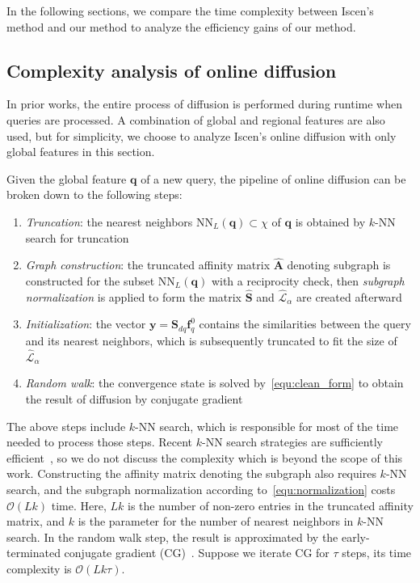 \documentclass[letterpaper]{article} \usepackage{aaai19}  \usepackage{times}  \usepackage{helvet}  \usepackage{courier}  \usepackage{url}  \usepackage{graphicx}  \frenchspacing  \setlength{\pdfpagewidth}{8.5in}  \setlength{\pdfpageheight}{11in}
\begin{document}
In the following sections, we compare the time complexity between Iscen's method and our method to analyze the efficiency gains of our method.


\subsection{Complexity analysis of online diffusion}

In prior works, the entire process of diffusion is performed during runtime when queries are processed.
A combination of global and regional features are also used, but for simplicity, we choose to analyze Iscen's online diffusion with only global features in this section.


Given the global feature $\mathbf{q}$ of a new query, the pipeline of online diffusion can be broken down to the following steps:
\begin{enumerate}
\item \emph{Truncation}: the nearest neighbors $\textrm{NN}_L(\mathbf{q})\subset\chi$ of $\mathbf{q}$ is obtained by $k$-NN search for truncation
\item \emph{Graph construction}: the truncated affinity matrix $\hat{\mathbf{A}}$ denoting subgraph is constructed for the subset $\textrm{NN}_L(\mathbf{q})$ with a reciprocity check,
then \textit{subgraph normalization} is applied to form the matrix $\hat{\mathbf{S}}$ and $\hat{\mathcal{L}}_\alpha$ are created afterward
\item \emph{Initialization}: the vector $\mathbf{y}=\mathbf{S}_{dq}\mathbf{f}_q^0$ contains the similarities between the query and its nearest neighbors, which is subsequently truncated to fit the size of $\hat{\mathcal{L}}_\alpha$
\item \textit{Random walk}: the convergence state is solved by~\cref{equ:clean_form} to obtain the result of diffusion by conjugate gradient
\end{enumerate}
The above steps include $k$-NN search, which is responsible for most of the time needed to process those steps.
Recent $k$-NN search strategies are sufficiently efficient~\cite{jegou2011product,malkov2016efficient,johnson2017billion}, so we do not discuss the complexity which is beyond the scope of this work.
Constructing the affinity matrix denoting the subgraph also requires $k$-NN search,
and the subgraph normalization according to~\cref{equ:normalization} costs $\mathcal{O}(Lk)$ time.
Here, $Lk$ is the number of non-zero entries in the truncated affinity matrix, and $k$ is the parameter for the number of nearest neighbors in $k$-NN search.
In the random walk step, the result is approximated by the early-terminated conjugate gradient (CG)~\cite{nocedal2006numerical,iscen2017efficient}.
Suppose we iterate CG for $\tau$ steps, its time complexity is $\mathcal{O}(Lk\tau)$.
\end{document}

